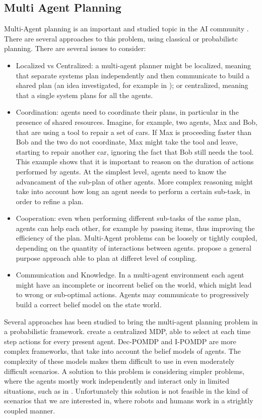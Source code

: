 \subsection{Multi Agent Planning}
Multi-Agent planning   is an important and studied topic in the AI community \cite{durfee1999survey}. There are several approaches to this problem, using classical or probabilistc planning. There are several issues to consider:
\begin{itemize}
\item Localized vs Centralized: a multi-agent planner might be localized, meaning that separate systems plan independently and then communicate to build a shared plan (an idea investigated, for example in \cite{nikolaidis2013cross,guestrin2002distributed} ); or centralized, meaning that a single system plans for all the agents.
\item Coordination: agents need to coordinate their plans, in particular in the presence of shared resources. Imagine, for example, two agents, Max and Bob, that are using a tool to repair a set of cars. If Max is proceeding faster than Bob and the two do not coordinate, Max might take the tool and leave, starting to repair another car, ignoring the fact that Bob still needs the tool. This example shows that it is important to reason on the duration of actions performed by agents. At the simplest level, agents need to know the advancament of the sub-plan of other agents. More complex reasoning might take into account how long an agent needs to perform a certain sub-task, in order to refine a plan. 
\item Cooperation: even when performing different sub-tasks of the same plan, agents can help each other, for example by passing items, thus improving the efficiency of the plan. Multi-Agent problems can be loosely or tightly coupled, depending on the quantity of interactions between agents. \cite{torreno2015approach} propose a general purpose approach able to plan at differet level of coupling.
\item Communication and Knowledge. In a multi-agent environment each agent might have an incomplete or incorrent belief on the world, which might lead to wrong or sub-optimal actions. Agents may communicate to progressively build a correct belief model on the state world. 
\end{itemize}

Several approaches has been studied to bring the multi-agent planning problem in a probabilistic framework. \cite{boutilier1999sequential} create a centralized MDP, able to select at each time step actions for every present agent. Dec-POMDP \cite{bernstein2002complexity} and I-POMDP \cite{gmytrasiewicz2005framework} are more complex frameworks, that take into account the belief models of agents. The complexity of these models makes them difficult to use in even moderately difficult scenarios. A solution to this problem is considering simpler problems, where the agents mostly work independently and interact only in limited situations, such as in \cite{melo2013heuristic}.  Unfortunately this solution is not feasible in the kind of scenarios that we are interested in, where robots and humans work in a strightly coupled manner. 

